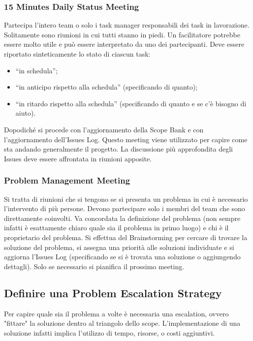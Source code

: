 \subsubsection{15 Minutes Daily Status Meeting}
Partecipa l’intero team o solo i task manager responsabili dei task in lavorazione. Solitamente sono riunioni in cui tutti stanno in piedi. Un facilitatore potrebbe essere molto utile e può essere interpretato da uno dei partecipanti. Deve essere riportato sinteticamente lo stato di ciascun task:
\begin{itemize}
	\item “in schedula”;
	\item “in anticipo rispetto alla schedula” (specificando di quanto);
	\item “in ritardo rispetto alla schedula” (specificando di quanto e se c’è bisogno di aiuto).
\end{itemize}
Dopodiché si procede con l'aggiornamento della Scope Bank e con l'aggiornamento dell’Issues Log. Questo meeting viene utilizzato per capire come sta andando generalmente il progetto. La discussione più approfondita degli Issues deve essere affrontata in riunioni apposite.

\subsubsection{Problem Management Meeting}
Si tratta di riunioni che si tengono se si presenta un problema in cui è necessario l'intervento di più persone. Devono partecipare solo i membri del team che sono direttamente coinvolti. Va concordata la definizione del problema (non sempre infatti è esattamente chiaro quale sia il problema in primo luogo) e chi è il proprietario del problema. Si effettua del Brainstorming per cercare di trovare la soluzione del problema, si assegna una priorità alle soluzioni individuate e si aggiorna l’Issues Log (specificando se si è trovata una soluzione o aggiungendo dettagli). Solo se necessario si pianifica il prossimo meeting.

\subsection{Definire una Problem Escalation Strategy}
Per capire quale sia il problema a volte è necessaria una escalation, ovvero "fittare" la soluzione dentro al triangolo dello scope. L'implementazione di una soluzione infatti implica l'utilizzo di tempo, risorse, o costi aggiuntivi.

